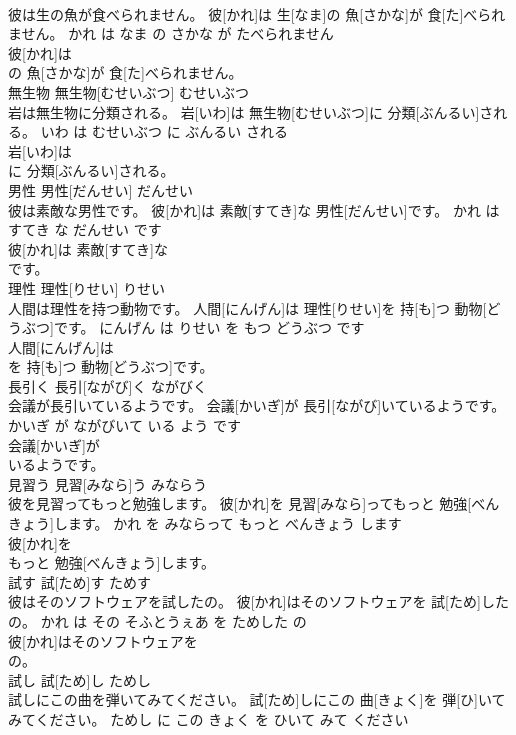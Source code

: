 \documentclass[8pt]{extreport}
\begin{document}
\begin{CJK}{UTF8}{min}
\\	彼は生の魚が食べられません。	彼[かれ]は 生[なま]の 魚[さかな]が 食[た]べられません。	かれ は なま の さかな が たべられません	
\\	彼[かれ]は
\\	の 魚[さかな]が 食[た]べられません。			
\\	無生物	無生物[むせいぶつ]	むせいぶつ	
\\	岩は無生物に分類される。	岩[いわ]は 無生物[むせいぶつ]に 分類[ぶんるい]される。	いわ は むせいぶつ に ぶんるい される	
\\	岩[いわ]は
\\	に 分類[ぶんるい]される。			
\\	男性	男性[だんせい]	だんせい	
\\	彼は素敵な男性です。	彼[かれ]は 素敵[すてき]な 男性[だんせい]です。	かれ は すてき な だんせい です	
\\	彼[かれ]は 素敵[すてき]な
\\	です。			
\\	理性	理性[りせい]	りせい	
\\	人間は理性を持つ動物です。	人間[にんげん]は 理性[りせい]を 持[も]つ 動物[どうぶつ]です。	にんげん は りせい を もつ どうぶつ です	
\\	人間[にんげん]は
\\	を 持[も]つ 動物[どうぶつ]です。			
\\	長引く	長引[ながび]く	ながびく	
\\	会議が長引いているようです。	会議[かいぎ]が 長引[ながび]いているようです。	かいぎ が ながびいて いる よう です	
\\	会議[かいぎ]が
\\	いるようです。			
\\	見習う	見習[みなら]う	みならう	
\\	彼を見習ってもっと勉強します。	彼[かれ]を 見習[みなら]ってもっと 勉強[べんきょう]します。	かれ を みならって もっと べんきょう します	
\\	彼[かれ]を
\\	もっと 勉強[べんきょう]します。			
\\	試す	試[ため]す	ためす	
\\	彼はそのソフトウェアを試したの。	彼[かれ]はそのソフトウェアを 試[ため]したの。	かれ は その そふとうぇあ を ためした の	
\\	彼[かれ]はそのソフトウェアを
\\	の。			
\\	試し	試[ため]し	ためし	
\\	試しにこの曲を弾いてみてください。	試[ため]しにこの 曲[きょく]を 弾[ひ]いてみてください。	ためし に この きょく を ひいて みて ください	

\end{CJK}
\end{document}
